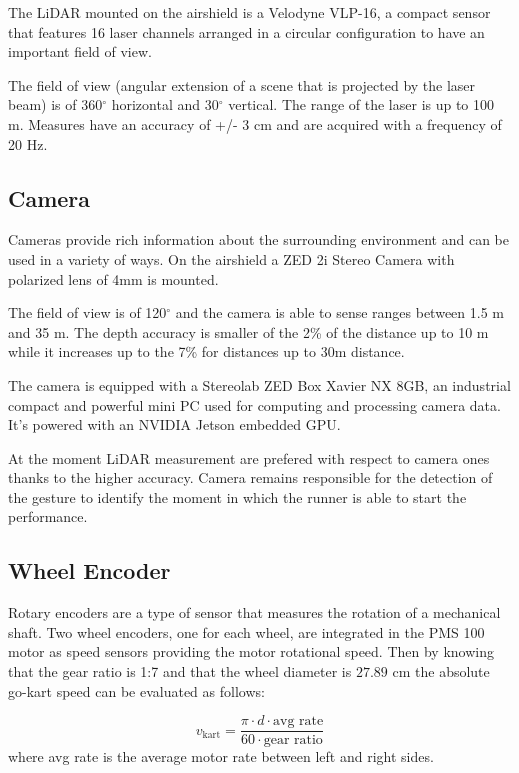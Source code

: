\documentclass[a4paper,12pt,oneside]{book}
\begin{document}
The LiDAR mounted on the airshield is a Velodyne VLP-16, a compact sensor that features 16 laser channels arranged in a circular configuration to have an important field of view.

The field of view (angular extension of a scene that is projected by the laser beam) is of 360$^\circ$ horizontal and 30$^\circ$ vertical.
The range of the laser is up to 100 m. 
Measures have an accuracy of +/- 3 cm and are acquired with a frequency of 20 Hz.

\subsection*{Camera}
Cameras provide rich information about the surrounding environment and can be used in a variety of ways.
On the airshield a ZED 2i Stereo Camera with polarized lens of 4mm is mounted.

The field of view is of 120$^\circ$ and the camera is able to sense ranges between 1.5 m and 35 m. 
The depth accuracy is smaller of the 2\% of the distance up to 10 m while it increases up to the 7\% for distances up to 30m distance.

The camera is equipped with a Stereolab ZED Box Xavier NX 8GB, an industrial compact and powerful mini PC used for computing and processing camera data.
It's powered with an NVIDIA Jetson embedded GPU.

At the moment LiDAR measurement are prefered with respect to camera ones thanks to the higher accuracy.
Camera remains responsible for the detection of the gesture to identify the moment in which the runner is able to start the performance. 

\subsection*{Wheel Encoder}
Rotary encoders are a type of sensor that measures the rotation of a mechanical shaft.
Two wheel encoders, one for each wheel, are integrated in the PMS 100 motor as speed sensors providing the motor rotational speed.
Then by knowing that the gear ratio is 1:7 and that the wheel diameter is $27.89$ cm the absolute go-kart speed can be evaluated as follows:

\begin{equation}
    v_{\text{kart}} = \frac{\pi \cdot d \cdot \text{avg rate}}{60 \cdot \text{gear ratio}}
\end{equation}
where avg rate is the average motor rate between left and right sides.
\end{document}

